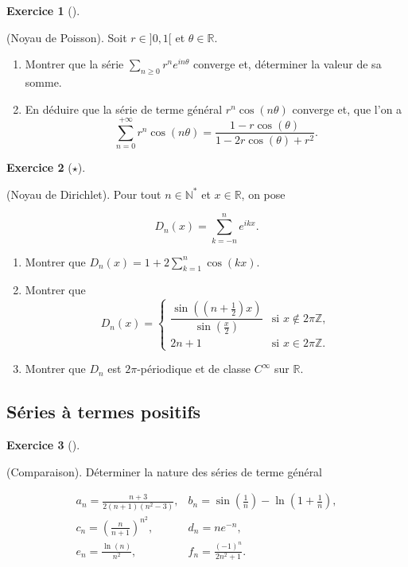 \documentclass[
  french,
  letterpaper,
  DIV=11,
  numbers=noendperiod]{scrreprt}
\theoremstyle{plain}
\theoremstyle{definition}
\theoremstyle{plain}
\theoremstyle{plain}
\theoremstyle{definition}
\newtheorem{exercise}{Exercice}[chapter]
\theoremstyle{definition}
\theoremstyle{plain}
\theoremstyle{remark}
\begin{document}
\begin{exercise}[]\protect\hypertarget{exr-02-poisson}{}\label{exr-02-poisson}

(Noyau de Poisson). Soit \(r\in]0,1[\) et \(\theta\in \mathbb{R}\).

\begin{enumerate}
\def\labelenumi{\arabic{enumi}.}
\item
  Montrer que la série \(\sum_{n\geqslant 0} r^ne^{in\theta}\) converge
  et, déterminer la valeur de sa somme.
\item
  En déduire que la série de terme général \(r^n\cos(n\theta)\) converge
  et, que l'on a
  \[\sum_{n=0}^{+\infty}r^n\cos(n\theta) = \frac{1-r\cos(\theta)}{1-2r\cos(\theta)+r^2}.\]
\end{enumerate}

\end{exercise}

\begin{exercise}[\(\star\)]\protect\hypertarget{exr-02-dirichlet}{}\label{exr-02-dirichlet}

(Noyau de Dirichlet). Pour tout \(n\in\mathbb{N}^*\) et
\(x\in\mathbb{R}\), on pose

\[
D_n(x) = \sum_{k=-n}^ne^{ikx}.
\]

\begin{enumerate}
\def\labelenumi{\arabic{enumi}.}
\item
  Montrer que \(D_n(x) = 1 + 2\sum_{k=1}^n\cos(kx)\).
\item
  Montrer que \[D_n(x) =\left\{
      \begin{array}{cc}
           \dfrac{\sin\left(\left(n+\frac{1}{2}\right)x\right)}{\sin\left(\frac{x}{2}\right)} &\text{si $x\notin 2\pi\mathbb{Z}$},  \\
           2n+1& \text{si $x\in 2\pi\mathbb{Z}$.} 
      \end{array}
      \right.\]
\item
  Montrer que \(D_n\) est \(2\pi\)-périodique et de classe \(C^\infty\)
  sur \(\mathbb{R}\).
\end{enumerate}

\end{exercise}

\subsection{Séries à termes
positifs}\label{suxe9ries-uxe0-termes-positifs}

\begin{exercise}[]\protect\hypertarget{exr-02-comp}{}\label{exr-02-comp}

(Comparaison). Déterminer la nature des séries de terme général

\[
\begin{array}{ll}
a_n = \frac{n+3}{2(n+1)(n^2-3)},        & b_n = \sin\left(\frac{1}{n}\right) - \ln\left(1+\frac{1}{n}\right),\\
c_n = \left(\frac{n}{n+1}\right)^{n^2}, & d_n =ne^{-n},\\
e_n =\frac{\ln(n)}{n^2},                & f_{n}=\frac{(-1)^{n}}{2n^{2}+1}.
\end{array}
\]

\end{exercise}
\end{document}
